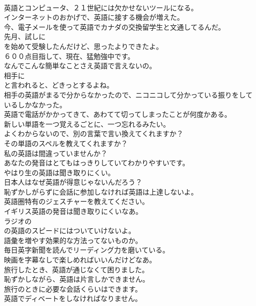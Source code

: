 \documentclass[8pt]{extreport}
\begin{document}
\begin{CJK}{UTF8}{min}
\\	英語とコンピュータ、２１世紀には欠かせないツールになる。	
\\	インターネットのおかげで、英語に接する機会が増えた。	
\\	今、電子メールを使って英語でカナダの交換留学生と文通してるんだ。	
\\	先月、試しに
\\	を始めて受験したんだけど、思ったよりできたよ。	
\\	６００点目指して、現在、猛勉強中です。	
\\	なんでこんな簡単なことさえ英語で言えないの。	
\\	相手に
\\	と言われると、どきっとするよね。	
\\	相手の英語がまるで分からなかったので、ニコニコして分かっている振りをしているしかなかった。	
\\	英語で電話がかかってきて、あわてて切ってしまったことが何度かある。	
\\	新しい単語を一つ覚えるごとに、一つ忘れるみたい。	
\\	よくわからないので、別の言葉で言い換えてくれますか？	
\\	その単語のスペルを教えてくれますか？	
\\	私の英語は間違っていませんか？	
\\	あなたの発音はとてもはっきりしていてわかりやすいです。	
\\	やはり生の英語は聞き取りにくい。	
\\	日本人はなぜ英語が得意じゃないんだろう？	
\\	恥ずかしがらずに会話に参加しなければ英語は上達しないよ。	
\\	英語圏特有のジェスチャーを教えてください。	
\\	イギリス英語の発音は聞き取りにくいなあ。	
\\	ラジオの
\\	の英語のスピードにはついていけないよ。	
\\	語彙を増やす効果的な方法ってないものか。	
\\	毎日英字新聞を読んでリーディング力を磨いている。	
\\	映画を字幕なしで楽しめればいいんだけどなあ。	
\\	旅行したとき、英語が通じなくて困りました。	
\\	恥ずかしながら、英語は片言しかできません。	
\\	旅行のときに必要な会話くらいはできます。	
\\	英語でディベートをしなければなりません。	

\end{CJK}
\end{document}
